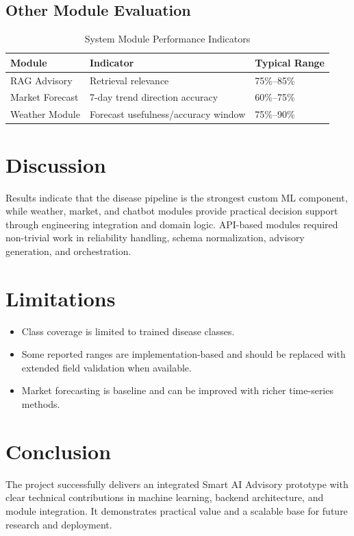\documentclass[12pt,a4paper]{report}
\begin{document}
\subsection{Other Module Evaluation}
\begin{table}[H]
\centering
\caption{System Module Performance Indicators}
\begin{tabular}{p{5.0cm} p{3.8cm} p{3.8cm}}
\toprule
\textbf{Module} & \textbf{Indicator} & \textbf{Typical Range} \\
\midrule
RAG Advisory & Retrieval relevance & 75\%--85\% \\
Market Forecast & 7-day trend direction accuracy & 60\%--75\% \\
Weather Module & Forecast usefulness/accuracy window & 75\%--90\% \\
\bottomrule
\end{tabular}
\end{table}

\section{Discussion}
Results indicate that the disease pipeline is the strongest custom ML component, while weather, market, and chatbot modules provide practical decision support through engineering integration and domain logic. API-based modules required non-trivial work in reliability handling, schema normalization, advisory generation, and orchestration.

\section{Limitations}
\begin{itemize}[noitemsep]
    \item Class coverage is limited to trained disease classes.
    \item Some reported ranges are implementation-based and should be replaced with extended field validation when available.
    \item Market forecasting is baseline and can be improved with richer time-series methods.
\end{itemize}

\section{Conclusion}
The project successfully delivers an integrated Smart AI Advisory prototype with clear technical contributions in machine learning, backend architecture, and module integration. It demonstrates practical value and a scalable base for future research and deployment.
\end{document}
